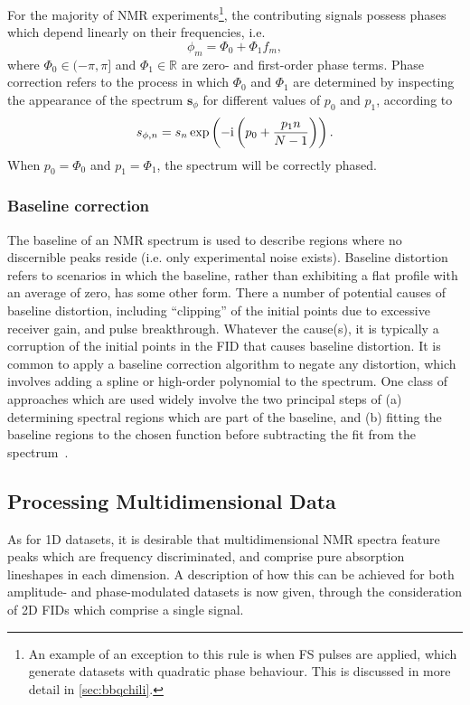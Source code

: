 For the majority of \ac{NMR} experiments\footnote{
     An example of an exception to this rule is when \acl{FS} pulses are applied,
     which generate datasets with quadratic phase behaviour. This is discussed
     in more detail in \cref{sec:bbqchili}.
}, the contributing signals possess phases which depend linearly on their
frequencies, i.e.
\begin{equation}
    \phi_m = \Phi_0 + \Phi_1 f_m,
\end{equation}
where $\Phi_0 \in (-\pi, \pi]$ and $\Phi_1 \in \mathbb{R}$ are zero- and
first-order phase terms.
Phase correction refers to the process in which $\Phi_0$ and $\Phi_1$ are
determined by inspecting the appearance of the spectrum
$\symbf{s}_{\phi}$ for different values of $p_0$ and  $p_1$, according to
\begin{equation}
    s_{\phi,n} = s_n
    \exp\left(-\mathrm{i} \left(p_0 + \frac{p_1 n}{N - 1}\right)\right).
\end{equation}
When $p_0 = \Phi_0$ and  $p_1 = \Phi_1$, the spectrum will be correctly phased.

\subsubsection{Baseline correction}
The baseline of an \ac{NMR} spectrum is used to describe regions where
no discernible peaks reside (i.e. only experimental noise exists).
Baseline distortion refers to scenarios in which the baseline, rather
than exhibiting a flat profile with an average of zero, has some other form.
There a number of potential causes of baseline distortion, including
``clipping'' of the initial points due to excessive receiver gain,
and pulse breakthrough.
Whatever the cause(s), it is typically a corruption of the initial points in
the \ac{FID} that causes baseline distortion.
It is common to apply a baseline correction algorithm to negate any distortion,
which involves adding a spline or high-order polynomial to the spectrum.
One class of approaches which are used widely involve the two principal steps
of (a) determining spectral regions which are part of the baseline, and (b)
fitting the baseline regions to the chosen
function before subtracting the fit from the
spectrum~\cite{Dietrich1991,Cobas2006}.

\subsection{Processing Multidimensional Data}
\label{subsec:multidim}
As for \ac{1D} datasets, it is desirable that multidimensional \ac{NMR} spectra
feature peaks which are frequency discriminated, and comprise pure
absorption lineshapes in each dimension.
A description of how this can be achieved for both amplitude- and
phase-modulated datasets is now given, through the consideration of \ac{2D}
\acp{FID} which comprise a single signal.

